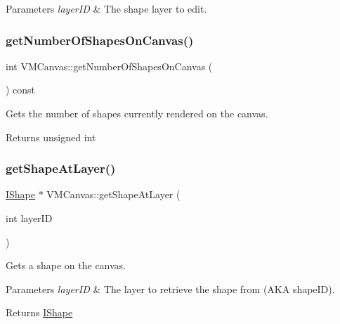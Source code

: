 \begin{DoxyParams}{Parameters}
{\em layer\+ID} & The shape layer to edit. \\
\hline
\end{DoxyParams}
\mbox{\label{class_v_m_canvas_a92907a64db6ce0b762490f1846ef4abe}} 
\subsubsection{\texorpdfstring{getNumberOfShapesOnCanvas()}{getNumberOfShapesOnCanvas()}}
{\footnotesize\ttfamily int V\+M\+Canvas\+::get\+Number\+Of\+Shapes\+On\+Canvas (\begin{DoxyParamCaption}{ }\end{DoxyParamCaption}) const}



Gets the number of shapes currently rendered on the canvas. 

\begin{DoxyReturn}{Returns}
unsigned int 
\end{DoxyReturn}
\mbox{\label{class_v_m_canvas_aa0d7e62214392970b7e229f25b5d270b}} 
\subsubsection{\texorpdfstring{getShapeAtLayer()}{getShapeAtLayer()}}
{\footnotesize\ttfamily \mbox{\hyperlink{class_i_shape}{I\+Shape}} $\ast$ V\+M\+Canvas\+::get\+Shape\+At\+Layer (\begin{DoxyParamCaption}\item[{int}]{layer\+ID }\end{DoxyParamCaption})}



Gets a shape on the canvas. 


\begin{DoxyParams}{Parameters}
{\em layer\+ID} & The layer to retrieve the shape from (A\+KA shape\+ID). \\
\hline
\end{DoxyParams}
\begin{DoxyReturn}{Returns}
\mbox{\hyperlink{class_i_shape}{I\+Shape}} 
\end{DoxyReturn}
\mbox{\label{class_v_m_canvas_a58092a70072af434ce7f712eff21c187}} 
